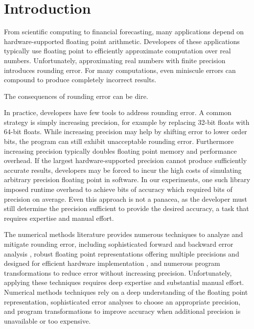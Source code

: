 \documentclass[paper.tex]{subfiles}
\begin{document}
\section{Introduction}
\label{sec:introduction}

From scientific computing to financial forecasting, many applications
depend on hardware-supported floating point arithmetic. Developers of
these applications typically use floating point to efficiently
approximate computation over real numbers.  Unfortunately,
approximating real numbers with finite precision introduces rounding
error.  For many computations, even miniscule errors can compound to
produce completely incorrect results.

The consequences of rounding error can be dire. 

In practice, developers have few tools to address rounding error.  A
common strategy is simply increasing precision, for example by
replacing 32-bit floats with 64-bit floats.  While increasing
precision may help by shifting error to lower order bits, the program
can still exhibit unacceptable rounding error.  Furthermore increasing
precision typically doubles floating point memory and performance
overhead. If the largest hardware-supported precision cannot produce
sufficiently accurate results, developers may be forced to incur the
high costs of simulating arbitrary precision floating point in
software.  In our experiments, one such library imposed  runtime overhead to achieve  bits of accuracy
which required  bits of precision on average. Even this
approach is not a panacea, as the developer must still determine the
precision sufficient to provide the desired accuracy, a task that
requires expertise and manual effort.

The numerical methods literature provides numerous techniques to
analyze and mitigate rounding error, including sophisticated forward
and backward error analysis , robust floating point
representations offering multiple precisions and designed for
efficient hardware implementation , and numerous program
transformations to reduce error  without increasing
precision.  Unfortunately, applying these techniques requires deep
expertise and substantial manual effort.  Numerical methods techniques
rely on a deep understanding of the floating point representation,
sophisticated error analyses to choose an appropriate precision, and
program transformations to improve accuracy when additional precision
is unavailable or too expensive.
\end{document}
